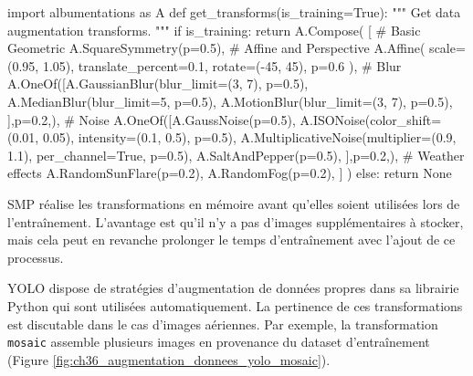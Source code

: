 \begin{code}[H]
    \begin{pythoncode}
    import albumentations as A
    def get_transforms(is_training=True):
        """
        Get data augmentation transforms.
        """
        if is_training:
            return A.Compose(
                [
                    # Basic Geometric
                    A.SquareSymmetry(p=0.5),
                    # Affine and Perspective
                    A.Affine(
                        scale=(0.95, 1.05), translate_percent=0.1, rotate=(-45, 45), p=0.6
                    ),
                    # Blur
                    A.OneOf([A.GaussianBlur(blur_limit=(3, 7), p=0.5),
                            A.MedianBlur(blur_limit=5, p=0.5),
                            A.MotionBlur(blur_limit=(3, 7), p=0.5),
                        ],p=0.2,),
                    # Noise
                    A.OneOf([A.GaussNoise(p=0.5),
                            A.ISONoise(color_shift=(0.01, 0.05), intensity=(0.1, 0.5), p=0.5),
                            A.MultiplicativeNoise(multiplier=(0.9, 1.1), per_channel=True, p=0.5),
                            A.SaltAndPepper(p=0.5),
                        ],p=0.2,),
                    # Weather effects
                    A.RandomSunFlare(p=0.2),
                    A.RandomFog(p=0.2),
                ]
            )
        else:
            return None
    \end{pythoncode}
    \label{code:pipeline_augmentation_donnees}
\end{code}

SMP réalise les transformations en mémoire avant qu'elles soient utilisées lors de l'entraînement. L'avantage est qu'il n'y a pas d'images supplémentaires à stocker, mais cela peut en revanche prolonger le temps d'entraînement avec l'ajout de ce processus.

YOLO dispose de stratégies d'augmentation de données propres dans sa librairie Python qui sont utilisées automatiquement. La pertinence de ces transformations est discutable dans le cas d'images aériennes. Par exemple, la transformation \texttt{mosaic} assemble plusieurs images en provenance du dataset d'entraînement (Figure \ref{fig:ch36_augmentation_donnees_yolo_mosaic}).

